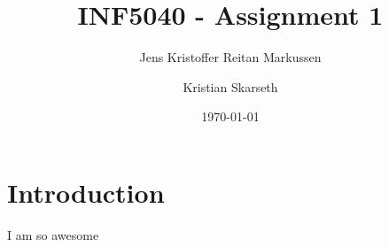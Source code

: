 \documentclass[11pt]{article}
\title{INF5040 - Assignment 1}
\author{
	Jens Kristoffer Reitan Markussen \and 
	Kristian Skarseth
}
\date{\today}
\begin{document}
 	\maketitle 

	\section{Introduction}
	I am so awesome
\end{document}
